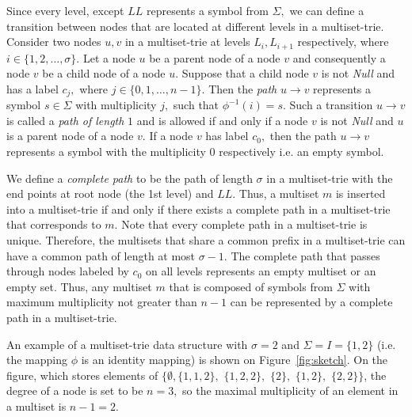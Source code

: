 Since every level, except $LL$ represents a symbol from $\Sigma,$ we can define 
a transition between nodes that are located at different levels in a multiset-trie. 
%
Consider two nodes $u,v$ in a multiset-trie at levels $L_i, L_{i+1}$ respectively, 
where $i\in\{1,2,\ldots,\sigma\}.$ Let a node $u$ be a parent node of a node $v$ 
and consequently a node $v$ be a child node of a node $u.$ Suppose that a child 
node $v$ is not \emph{Null} and has a label $c_j,$ where $j\in\{ 0,1,\ldots, n-1 \}.$ 
%
Then the \emph{path} $u\rightarrow v$ represents a symbol $s\in\Sigma$ with 
multiplicity $j,$ such that $\phi^{-1}(i) = s.$ 
%
Such a transition $u\rightarrow v$ is called a \emph{path of length} $1$ and is 
allowed if and only if a node $v$ is not \emph{Null} and $u$ is a parent node of 
a node $v.$ If a node $v$ has label $c_0,$ then the path $u\rightarrow v$ 
represents a symbol with the multiplicity $0$ respectively i.e. an empty symbol.

We define a \emph{complete path} to be the path of length $\sigma$ in a 
multiset-trie with the end points at root node (the 1st level) and $LL$. Thus, 
a multiset $m$ is inserted into a multiset-trie if and only if there exists a 
complete path in a multiset-trie that corresponds to $m.$
%
Note that every complete path in a multiset-trie is unique. Therefore, the multisets 
that share a common prefix in a multiset-trie can have a common path of length at 
most $\sigma-1.$ The complete path that passes through nodes labeled by $c_0$ 
on all levels represents an empty multiset or an empty set.
%
Thus, any multiset $m$ that is composed of symbols from $\Sigma$ with maximum 
multiplicity not greater than $n-1$ can be represented by a complete path in a multiset-trie.

An example of a multiset-trie data structure with $\sigma = 2$ and 
$\Sigma = I = \{ 1,2 \}$ (i.e. the mapping $\phi$ is an identity mapping) is shown on Figure~\ref{fig:sketch}. 
On the figure, which stores elements of $\{\emptyset, \{ 1,1,2 \},$ $\{ 1,2,2 \},$ $\{ 2 \},$ $\{ 1,2 \},$ $\{ 2,2 \}\}$, the degree of a node is set to be $n=3,$ so the maximal multiplicity of an element in 
a multiset is $n-1=2.$  

